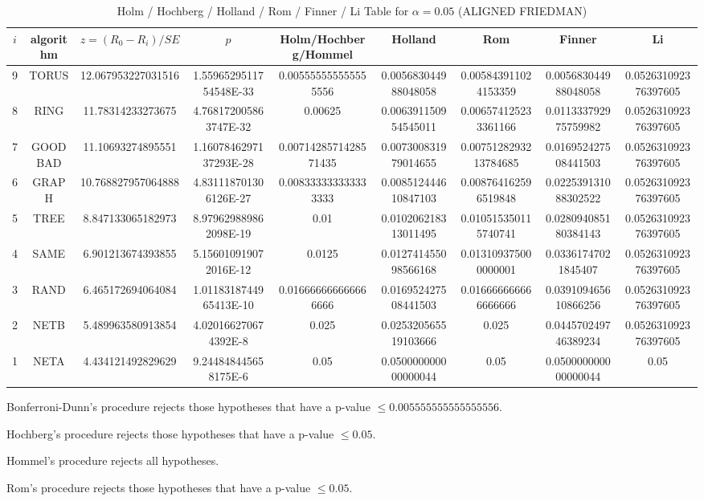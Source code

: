 \documentclass[a4paper,10pt]{article}
\begin{document}
\begin{landscape}
\newpage

\begin{table}[!htp]
\centering\scriptsize
\caption{Holm / Hochberg / Holland / Rom / Finner / Li Table for $\alpha=0.05$ (ALIGNED FRIEDMAN)}
\begin{tabular}{ccccccccc}
$i$&algorithm&$z=(R_0 - R_i)/SE$&$p$&Holm/Hochberg/Hommel&Holland&Rom&Finner&Li\\
\hline
9& TORUS&12.067953227031516&1.5596529511754548E-33&0.005555555555555556&0.005683044988048058&0.005843911024153359&0.005683044988048058&0.052631092376397605\\
8& RING&11.78314233273675&4.768172005863747E-32&0.00625&0.006391150954545011&0.006574125233361166&0.011333792975759982&0.052631092376397605\\
7& GOODBAD&11.10693274895551&1.1607846297137293E-28&0.0071428571428571435&0.007300831979014655&0.0075128293213784685&0.016952427508441503&0.052631092376397605\\
6& GRAPH&10.768827957064888&4.831118701306126E-27&0.008333333333333333&0.008512444610847103&0.008764162596519848&0.022539131088302522&0.052631092376397605\\
5& TREE&8.847133065182973&8.979629889862098E-19&0.01&0.010206218313011495&0.010515350115740741&0.028094085180384143&0.052631092376397605\\
4& SAME&6.901213674393855&5.156010919072016E-12&0.0125&0.012741455098566168&0.013109375000000001&0.03361747021845407&0.052631092376397605\\
3& RAND&6.465172694064084&1.0118318744965413E-10&0.016666666666666666&0.016952427508441503&0.016666666666666666&0.039109465610866256&0.052631092376397605\\
2& NETB&5.489963580913854&4.020166270674392E-8&0.025&0.025320565519103666&0.025&0.044570249746389234&0.052631092376397605\\
1& NETA&4.434121492829629&9.244848445658175E-6&0.05&0.050000000000000044&0.05&0.050000000000000044&0.05\\
\hline
\end{tabular}
\end{table}
Bonferroni-Dunn's procedure rejects those hypotheses that have a p-value $\le0.005555555555555556$.


Hochberg's procedure rejects those hypotheses that have a p-value $\le0.05$.


Hommel's procedure rejects all hypotheses.


Rom's procedure rejects those hypotheses that have a p-value $\le0.05$.



\end{landscape}
\end{document}
